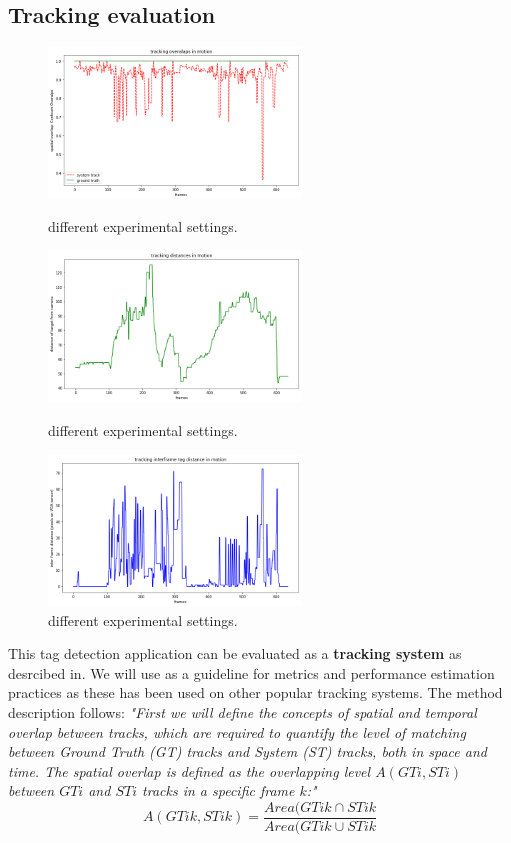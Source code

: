\documentclass[a4paper]{report}
\begin{document}
\subsection{Tracking evaluation}

\begin{figure}
    \includegraphics[width=0.6\textwidth]{rat1.png}
    \caption{different experimental settings.}
    \label{fig:ovlp1}
    \includegraphics[width=0.6\textwidth]{rat2.png}
    \caption{different experimental settings.}
    \label{fig:ovlp2}
    \includegraphics[width=0.6\textwidth]{rat3.png}
    \caption{different experimental settings.}
    \label{fig:ovlp3}
\end{figure}

This tag detection application can be evaluated as a \textbf{tracking system} as desrcibed in\cite{Performance}. We will use \cite{Performance} as a guideline for metrics and performance estimation practices as these has been used on other popular tracking systems.
The method description follows: \textit{"First we will define the concepts of spatial and temporal overlap between tracks, which are required to quantify the level of matching between Ground Truth (GT)  tracks and System (ST) tracks, both in space and time. The spatial overlap is defined as the overlapping level $A(GTi,  STi)$ between $GTi$ and $STi$ tracks in a specific frame $k$:"} \cite{Performance} $$ A(GTik,  STik) = \frac{Area( GTik \cap STik}{Area( GTik \cup STik} $$
\end{document}
